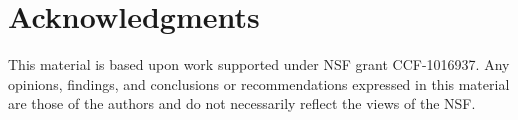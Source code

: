 \documentclass[nocopyrightspace,natbib]{sigplanconf}
\begin{document}
\section*{Acknowledgments}

This material is based upon work 
supported under NSF grant CCF-1016937.
Any opinions, findings, and conclusions or recommendations
   expressed in this material are those of the authors and do not
   necessarily reflect the views of the NSF.


%



%
\end{document}
